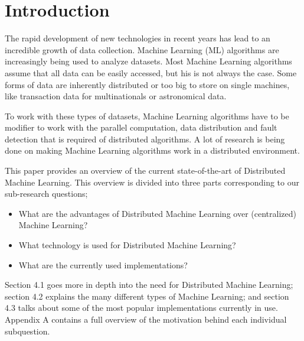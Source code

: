 \section{Introduction}


The rapid development of new technologies in recent years has lead to an incredible growth of data collection. Machine Learning (ML) algorithms are increasingly being used to analyze datasets. Most Machine Learning algorithms assume that all data can be easily accessed, but his is not always the case. Some forms of data are inherently distributed or too big to store on single machines, like transaction data for multinationals or astronomical data.

To work with these types of datasets, Machine Learning algorithms have to be modifier to work with the parallel computation, data distribution and fault detection that is required of distributed algorithms. A lot of research is being done on making Machine Learning algorithms work in a distributed environment.

This paper provides an overview of the current state-of-the-art of Distributed Machine Learning. This overview is divided into three parts corresponding to our sub-research questions;
\begin{itemize}
	\item What are the advantages of Distributed Machine Learning over (centralized) Machine Learning?
	\item What technology is used for Distributed Machine Learning?
	\item What are the currently used implementations?
\end{itemize}
Section 4.1 goes more in depth into the need for Distributed Machine Learning; section 4.2 explains the many different types of Machine Learning; and section 4.3 talks about some of the most popular implementations currently in use. Appendix A contains a full overview of the motivation behind each individual subquestion.

